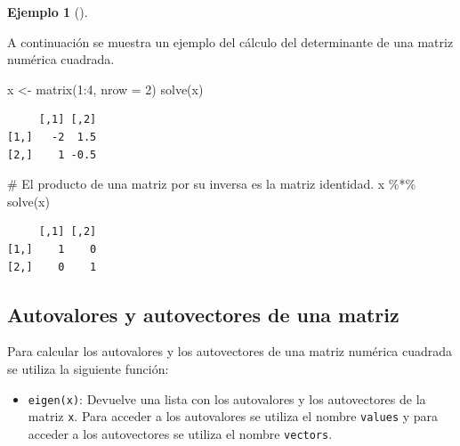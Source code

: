 \documentclass[
  a4paper,
]{scrreport}
\newenvironment{Shaded}{\begin{snugshade}}{\end{snugshade}}
\newcommand{\AttributeTok}[1]{\textcolor[rgb]{0.40,0.45,0.13}{#1}}
\newcommand{\CommentTok}[1]{\textcolor[rgb]{0.37,0.37,0.37}{#1}}
\newcommand{\DecValTok}[1]{\textcolor[rgb]{0.68,0.00,0.00}{#1}}
\newcommand{\FunctionTok}[1]{\textcolor[rgb]{0.28,0.35,0.67}{#1}}
\newcommand{\NormalTok}[1]{\textcolor[rgb]{0.00,0.23,0.31}{#1}}
\newcommand{\OtherTok}[1]{\textcolor[rgb]{0.00,0.23,0.31}{#1}}
\newcommand{\SpecialCharTok}[1]{\textcolor[rgb]{0.37,0.37,0.37}{#1}}
\providecommand{\tightlist}{%
  \setlength{\itemsep}{0pt}\setlength{\parskip}{0pt}}\usepackage{longtable,booktabs,array}
\theoremstyle{definition}
\newtheorem{example}{Ejemplo}[chapter]
\theoremstyle{definition}
\theoremstyle{remark}
\begin{document}
\leavevmode{}%
\begin{example}[]\label{exm-inversa-matriz}

A continuación se muestra un ejemplo del cálculo del determinante de una
matriz numérica cuadrada.

\begin{Shaded}
\begin{Highlighting}[]
\NormalTok{x }\OtherTok{\textless{}{-}} \FunctionTok{matrix}\NormalTok{(}\DecValTok{1}\SpecialCharTok{:}\DecValTok{4}\NormalTok{, }\AttributeTok{nrow =} \DecValTok{2}\NormalTok{)}
\FunctionTok{solve}\NormalTok{(x)}
\end{Highlighting}
\end{Shaded}

\begin{verbatim}
     [,1] [,2]
[1,]   -2  1.5
[2,]    1 -0.5
\end{verbatim}

\begin{Shaded}
\begin{Highlighting}[]
\CommentTok{\# El producto de una matriz por su inversa es la matriz identidad.}
\NormalTok{x }\SpecialCharTok{\%*\%} \FunctionTok{solve}\NormalTok{(x)}
\end{Highlighting}
\end{Shaded}

\begin{verbatim}
     [,1] [,2]
[1,]    1    0
[2,]    0    1
\end{verbatim}

\end{example}

\hypertarget{autovalores-y-autovectores-de-una-matriz}{%
\subsection{Autovalores y autovectores de una
matriz}\label{autovalores-y-autovectores-de-una-matriz}}

Para calcular los autovalores y los autovectores de una matriz numérica
cuadrada se utiliza la siguiente función:

\begin{itemize}
\tightlist
\item
  \texttt{eigen(x)}: Devuelve una lista con los autovalores y los
  autovectores de la matriz \texttt{x}. Para acceder a los autovalores
  se utiliza el nombre \texttt{values} y para acceder a los autovectores
  se utiliza el nombre \texttt{vectors}.
\end{itemize}
\end{document}
